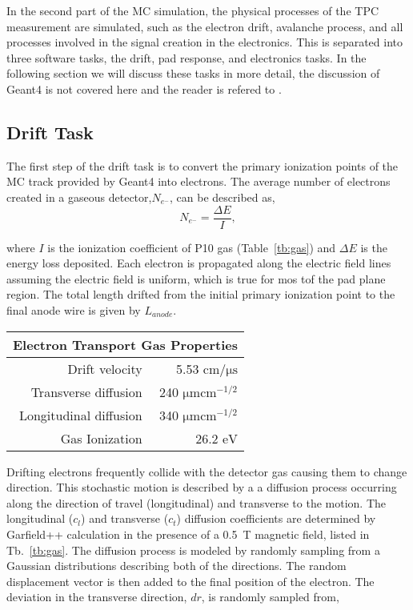 In the second part of the MC simulation, the physical processes of the TPC measurement are simulated, such as the electron drift, avalanche process, and all processes involved in the signal creation in the electronics. This is separated into three software tasks, the drift, pad response, and electronics tasks. In the following section we will discuss these tasks in more detail, the discussion of Geant4 is not covered here and the reader is refered to \cite{geant4}.  

\subsection{Drift Task}
 
 The first step of the drift task is to convert the primary ionization points of the MC track provided by Geant4 into electrons. The average number of electrons created in a gaseous detector,$N_{e^-}$, can be described as,
\begin{equation}
N_{e^{-}} =  \frac{\Delta E}{I},
\label{eq:kev2el}
\end{equation}
 
where $I$ is the ionization coefficient of P10 gas (Table~\ref{tb:gas}) and $\Delta E$ is the energy loss deposited. Each electron is propagated along the electric field lines assuming the electric field is uniform, which is true for mos tof the pad plane region. The total length drifted from the initial primary ionization point to the final anode wire is given by $L_{anode}$. 

\begin{table*}\centering
{}
\begin{tabular}{@{}rr@{}}\toprule 
\multicolumn{2}{c}{Electron Transport Gas Properties} \\
 \midrule
Drift velocity & 5.53 $\si{\centi\meter\per\micro\second}$\\
Transverse diffusion & 240 $\si{\micro \meter \centi\meter}^{-1/2}$\\
Longitudinal diffusion &  340 $\si{\micro \meter \centi\meter}^{-1/2}$\\
Gas Ionization & 26.2 $\si{\eV}$\\
\bottomrule
\end{tabular}
\caption{An overview of electron drift properties in P10 gas.}
\label{tb:gas}
\end{table*}

Drifting electrons frequently collide with the detector gas causing them to change direction. This stochastic motion is  described by a a diffusion process occurring along the direction of travel (longitudinal) and transverse to the motion. The longitudinal ($c_{l}$) and transverse ($c_{t}$) diffusion coefficients are determined by Garfield++ calculation  \cite{garfield++} in the presence of a \SI{0.5}{\tesla} magnetic field, listed in Tb.~\ref{tb:gas}. The diffusion process is modeled by randomly sampling from a Gaussian distributions describing both of the directions. The random displacement vector is then added to the final position of the electron. The deviation in the transverse direction, $dr$, is randomly sampled from,

